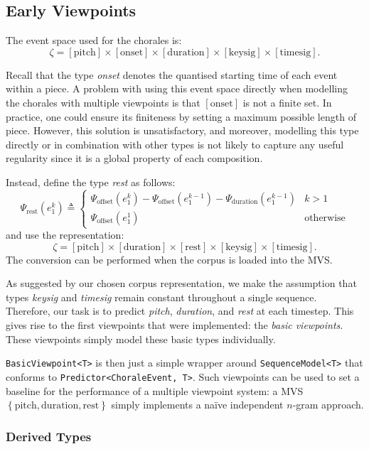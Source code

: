 \documentclass[12pt,a4paper,twoside,openright]{report}
\newcommand{\set}[1]{ \left\{ #1 \right\} }
\begin{document}
\subsection{Early Viewpoints}

The event space used for the chorales is:
$$ \zeta = [\mathrm{pitch}] \times [\mathrm{onset}] \times [\mathrm{duration}]
\times [\mathrm{keysig}] \times [\mathrm{timesig}]. $$

Recall that the type \emph{onset} denotes the quantised starting time of each
event within a piece.  A problem with using this event space directly when
modelling the chorales with multiple viewpoints is that $[\mathrm{onset}]$ is
not a finite set. In practice, one could ensure its finiteness by setting a
maximum possible length of piece. However, this solution is unsatisfactory, and
moreover, modelling this type directly or in combination with other types is not
likely to capture any useful regularity since it is a global property of each
composition.

Instead, define the type \emph{rest} as follows:
$$ \Psi_{\mathrm{rest}}(e_1^k) \triangleq \begin{cases} 
  \Psi_{\mathrm{offset}}(e_1^k) -
  \Psi_{\mathrm{offset}}(e_1^{k-1}) - \Psi_{\mathrm{duration}}(e_1^{k-1}) & k > 1 \\
  \Psi_{\mathrm{offset}}(e_1^1) & \text{otherwise}
\end{cases} $$
and use the representation:
$$ \zeta = [\mathrm{pitch}] \times [\mathrm{duration}] \times [\mathrm{rest}]
\times [\mathrm{keysig}] \times [\mathrm{timesig}]. $$
The conversion can be performed when the corpus is loaded into the MVS. 

As suggested by our chosen corpus representation, we make the assumption that
types \emph{keysig} and \emph{timesig} remain constant throughout a single
sequence. Therefore, our task is to predict \emph{pitch}, \emph{duration}, and
\emph{rest} at each timestep. This gives rise to the first viewpoints that were
implemented: the \emph{basic viewpoints}. These viewpoints simply model
these basic types individually.

\texttt{BasicViewpoint<T>} is then just a simple wrapper around
\texttt{SequenceModel<T>} that conforms to \texttt{Predictor<ChoraleEvent, T>}.
Such viewpoints can be used to set a baseline for the performance of a multiple
viewpoint system: a MVS $\set{\mathrm{pitch}, \mathrm{duration}, \mathrm{rest}}$
simply implements a naïve independent $n$-gram approach.

\subsubsection{Derived Types}
\end{document}
